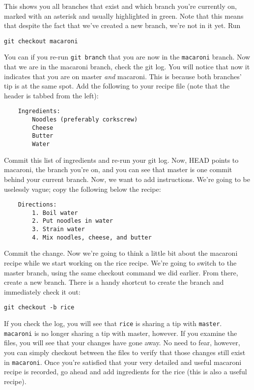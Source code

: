 \par{
This shows you all branches that exist and which branch you're currently on,
marked with an asterisk and usually highlighted in green. Note that this means
that despite the fact that we've created a new branch, we're not in it yet.
Run
}

\begin{verbatim}
git checkout macaroni
\end{verbatim}

\par{
You can if you re-run \verb+git branch+ that you are now in the
\verb+macaroni+ branch. Now that we are in the macaroni branch, check the git
log. You will notice that now it indicates that you are on master \emph{and}
macaroni. This is because both branches' tip is at the same spot. Add the
following to your recipe file (note that the header is tabbed from the left):
}

\begin{verbatim}
    Ingredients:
        Noodles (preferably corkscrew)
        Cheese
        Butter
        Water
\end{verbatim}

\par{
Commit this list of ingredients and re-run your git log. Now, HEAD points to
macaroni, the branch you're on, and you can see that master is one commit
behind your current branch. Now, we want to add instructions. We're going to
be uselessly vague; copy the following below the recipe:
}

\begin{verbatim}
    Directions:
        1. Boil water
        2. Put noodles in water
        3. Strain water
        4. Mix noodles, cheese, and butter
\end{verbatim}

\par{
Commit the change. Now we're going to think a little bit about the macaroni
recipe while we start working on the rice recipe. We're going to switch to the
master branch, using the same checkout command we did earlier. From there,
create a new branch. There is a handy shortcut to create the branch and
immediately check it out:
}

\begin{verbatim}
git checkout -b rice
\end{verbatim}

\par{
If you check the log, you will see that \verb+rice+ is sharing a tip with
\verb+master+. \verb+macaroni+ is no longer sharing a tip with master,
however. If you examine the files, you will see that your changes have gone
away. No need to fear, however, you can simply checkout between the files to
verify that those changes still exist in \verb+macaroni+. Once you're
satisfied that your very detailed and useful macaroni recipe is recorded, go
ahead and add ingredients for the rice (this is also a useful recipe).
}

